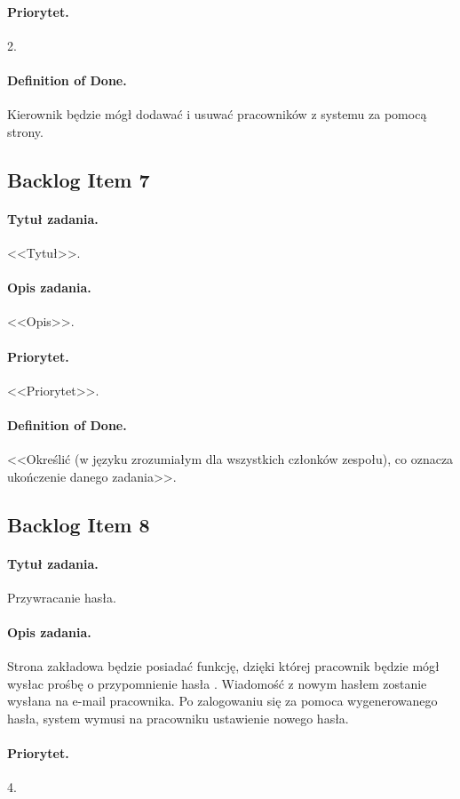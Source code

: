 \documentclass[a4paper]{article}
\begin{document}
\paragraph{Priorytet.} 2.
\paragraph{Definition of Done.} Kierownik będzie mógł dodawać i usuwać pracowników z systemu za pomocą strony.

\subsection{Backlog Item 7}
\paragraph{Tytuł zadania.} <<Tytuł>>.
\paragraph{Opis zadania.} <<Opis>>.
\paragraph{Priorytet.} <<Priorytet>>.
\paragraph{Definition of Done.} <<Określić (w języku zrozumiałym dla wszystkich członków zespołu), co oznacza ukończenie danego zadania>>.

\subsection{Backlog Item 8}
\paragraph{Tytuł zadania.} Przywracanie hasła.
\paragraph{Opis zadania.} Strona zakładowa będzie posiadać funkcję, dzięki której pracownik będzie mógł wysłac prośbę o przypomnienie hasła . Wiadomość z nowym hasłem zostanie wysłana na e-mail pracownika. Po zalogowaniu się za pomoca wygenerowanego hasła, system wymusi na pracowniku ustawienie nowego hasła.
\paragraph{Priorytet.} 4.
\end{document}
